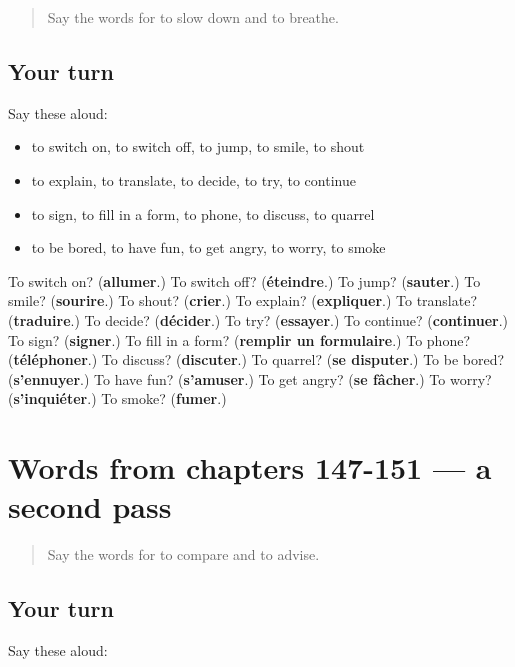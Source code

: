 \begin{quote}
Say the words for to slow down and to breathe.
\end{quote}

\subsection*{Your turn}
Say these aloud:

\begin{itemize}
\raggedright
  \item to switch on, to switch off, to jump, to smile, to shout
  \item to explain, to translate, to decide, to try, to continue
  \item to sign, to fill in a form, to phone, to discuss, to quarrel
  \item to be bored, to have fun, to get angry, to worry, to smoke
\end{itemize}

\begin{tcolorbox}[breakable,colback=teal!4,colframe=teal!35!black,title={Before you move on}]
To switch on? (\textbf{allumer}.) To switch off? (\textbf{éteindre}.) To jump? (\textbf{sauter}.) To smile? (\textbf{sourire}.) To shout? (\textbf{crier}.) To explain? (\textbf{expliquer}.) To translate? (\textbf{traduire}.) To decide? (\textbf{décider}.) To try? (\textbf{essayer}.) To continue? (\textbf{continuer}.) To sign? (\textbf{signer}.) To fill in a form? (\textbf{remplir un formulaire}.) To phone? (\textbf{téléphoner}.) To discuss? (\textbf{discuter}.) To quarrel? (\textbf{se disputer}.) To be bored? (\textbf{s'ennuyer}.) To have fun? (\textbf{s'amuser}.) To get angry? (\textbf{se fâcher}.) To worry? (\textbf{s'inquiéter}.) To smoke? (\textbf{fumer}.)
\end{tcolorbox}
\section[(dialogue)]{Words from chapters 147-151 — a second pass}

\label{lesson:FR-R151-second-pass-words-from-chapters-147-151}



\begin{quote}
Say the words for to compare and to advise.
\end{quote}

\subsection*{Your turn}
Say these aloud:

